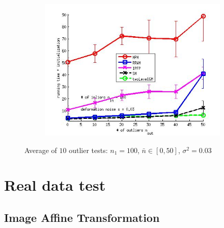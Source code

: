 \begin{figure}[h]
\begin{subfigure}[b]{0.3\textwidth}
		\includegraphics[scale=0.25]{"chapter3/fig/SyntheticTest/ver4.3.2/outliertest_n50/time_summary_avg10t"} 
	\end{subfigure} 	
	\caption{Average of $10$ outlier tests: $n_1=100$, $\bar{n}\in[0,50]$, $\sigma^2=0.03$}
	\label{fig:syntest3_ver432}
\end{figure}
\FloatBarrier




\section{Real data test}
\subsection{Image Affine Transformation}





